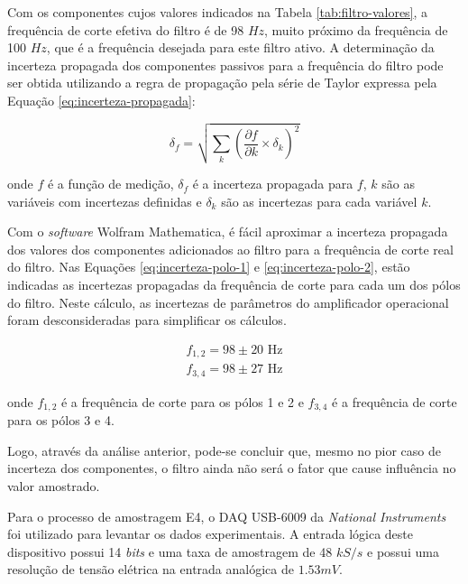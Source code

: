 \documentclass[a4paper]{instrumentacao}
\begin{document}
Com os componentes cujos valores indicados na Tabela \ref{tab:filtro-valores}, a frequência de corte efetiva do filtro é de 98 $Hz$, muito próximo da frequência de 100 $Hz$, que é a frequência desejada para este filtro ativo. A determinação da incerteza propagada dos componentes passivos para a frequência do filtro pode ser obtida utilizando a regra de propagação pela série de Taylor expressa pela Equação \ref{eq:incerteza-propagada}:

\begin{equation}
	\delta_f = \sqrt{
		\sum_{k} 
			\left(\frac{\partial f}{\partial k}\times \delta_k \right)^2
	}
	\label{eq:incerteza-propagada}
\end{equation}

\noindent
onde $f$ é a função de medição, $\delta_f$ é a incerteza propagada para $f$, $k$ são as variáveis com incertezas definidas e $\delta_k$ são as incertezas para cada variável $k$.


Com o \textit{software} Wolfram Mathematica, é fácil aproximar a incerteza propagada dos valores dos componentes adicionados ao filtro para a frequência de corte real do filtro. Nas Equações \ref{eq:incerteza-polo-1} e \ref{eq:incerteza-polo-2}, estão indicadas as incertezas propagadas da frequência de corte para cada um dos pólos do filtro. Neste cálculo, as incertezas de parâmetros do amplificador operacional foram desconsideradas para simplificar os cálculos.

\begin{eqnarray}
	f_{1,2} = 98 \pm 20 \label{eq:incerteza-polo-1} \text{ Hz} \\
	f_{3,4} = 98 \pm 27 \label{eq:incerteza-polo-2} \text{ Hz} 
\end{eqnarray}

\noindent
onde $f_{1,2}$ é a frequência de corte para os pólos 1 e 2 e $f_{3,4}$ é a frequência de corte para os pólos 3 e 4.

Logo, através da análise anterior, pode-se concluir que, mesmo no pior caso de incerteza dos componentes, o filtro ainda não será o fator que cause influência no valor amostrado.

Para o processo de amostragem E4, o DAQ USB-6009 da \textit{National Instruments} foi utilizado para levantar os dados experimentais. A entrada lógica deste dispositivo possui 14 \textit{bits} e uma taxa de amostragem de 48 $kS/s$ e possui uma resolução de tensão elétrica na entrada analógica de $1.53 mV$.
\end{document}
